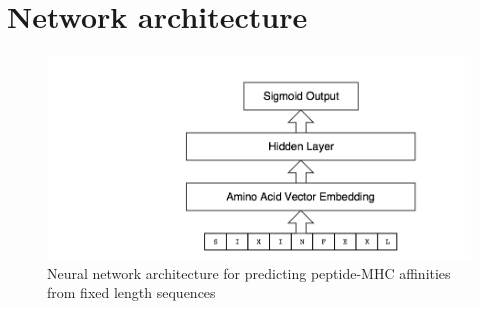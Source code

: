 
\section{Network architecture}

\begin{figure}[h]
\centering
\includegraphics[scale=0.5]{figures/mhcflurry-gliffy-network.png}
\caption{Neural network architecture for predicting peptide-MHC affinities from fixed length sequences}
\end{figure}